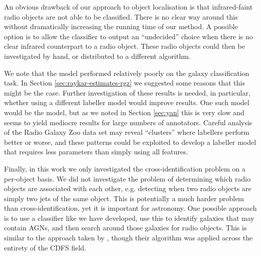   An obvious drawback of our approach to object localisation is that
  infrared-faint radio objects are not able to be classified. There is no clear
  way around this without dramatically increasing the running time of our
  method. A possible option is to allow the classifier to output an
  ``undecided'' choice when there is no clear infrared counterpart to a radio
  object. These radio objects could then be investigated by hand, or distributed
  to a different algorithm.

  We note that the \citeauthor{raykar10} model performed relatively poorly on
  the galaxy classification task. In Section \ref{sec:raykar-estimates-rgz} we
  suggested some reasons that this might be the case. Further investigation of
  these results is needed, in particular, whether using a different labeller
  model would improve results. One such model would be the \citeauthor{yan10}
  model, but as we noted in Section \ref{sec:yan} this is very slow and seems to
  yield mediocre results for large numbers of annotators. Careful analysis of
  the Radio Galaxy Zoo data set may reveal ``clusters'' where labellers perform
  better or worse, and these patterns could be exploited to develop a labeller
  model that requires less parameters than simply using all features.

  Finally, in this work we only investigated the cross-identification problem on
  a per-object basis. We did not investigate the problem of determining which
  radio objects are associated with each other, e.g. detecting when two radio
  objects are simply two jets of the same object. This is potentially a much
  harder problem than cross-identification, yet it is important for astronomy.
  One possible approach is to use a classifier like we have developed, use this
  to identify galaxies that may contain AGNs, and then search around those
  galaxies for radio objects. This is similar to the approach taken by
  \citet{fan15}, though their algorithm was applied across the entirety of the
  CDFS field.
